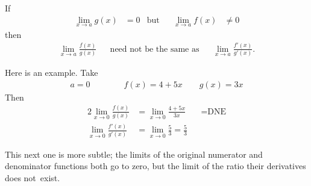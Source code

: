 \begin{warning}\label{warning:lhopital2}
If
\begin{align*}
\lim\limits_{x\rightarrow a}g(x)&=0
&\text{but}&&
\lim\limits_{x\rightarrow a}f(x)&\ne 0
\end{align*}
then
\begin{align*}
\lim\limits_{x\rightarrow a}\frac{f(x)}{g(x)}
&&  \text{need not be the same as} &&
\lim\limits_{x\rightarrow a}\frac{f'(x)}{g'(x)}.
\end{align*}

Here is an example. Take
\begin{align*}
a=0\qquad   \qquad f(x)=4+5x \qquad g(x)=3x
\end{align*}
Then
\begin{alignat*}{2}
\lim_{x\rightarrow 0}\frac{f(x)}{g(x)}
&=\lim_{x\rightarrow 0}\frac{4+5x}{3x} &
&=\text{DNE}\\[0.1in]
\lim_{x\rightarrow 0}\frac{f'(x)}{g'(x)}
&=\lim_{x\rightarrow 0}\frac{5}{3}
=\frac{5}{3}
\end{alignat*}
\end{warning}

This next one is more subtle; the limits of the original numerator and
denominator functions both go to zero, but the limit of the ratio their derivatives does
not~exist.

